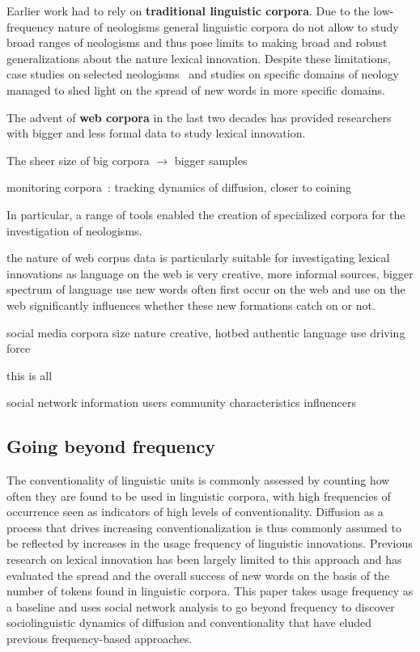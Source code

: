 \documentclass[a4paper]{scrartcl}
\renewcommand{\hw}[1]{\textbf{#1}}
\begin{document}
    Earlier work had to rely on \hw{traditional linguistic corpora}. Due to the low-frequency nature of neologisms general linguistic corpora do not allow to study broad ranges of neologisms and thus pose limits to making broad and robust generalizations about the nature lexical innovation. Despite these limitations, case studies on selected neologisms~\parencite{Hohenhaus2006} and studies on specific domains of neology~\parencite{Elsen2004} managed to shed light on the spread of new words in more specific domains.

    The advent of \hw{web corpora} in the last two decades has provided researchers with bigger and less formal data to study lexical innovation.

      The sheer size of big corpora $\rightarrow$ bigger samples

      monitoring corpora~\parencite{Davies2013}: tracking dynamics of diffusion, closer to coining

      In particular, a range of tools enabled the creation of specialized corpora for the investigation of neologisms.~\parencite{Renouf2006,Kerremans2012,Lemnitzer,Gerard2017,Cartier2017}

      the nature of web corpus data is particularly suitable for investigating lexical innovations as
        language on the web is very creative,
        more informal sources, bigger spectrum of language use
        new words often first occur on the web
        and use on the web significantly influences whether these new formations catch on or not.

    social media corpora \cite{Grieve2016,Eisenstein2014}
      size
      nature
        creative, hotbed
        authentic language use
        driving force

    this is all

      social network information
        users
        community characteristics
        influencers

  \subsection{Going beyond frequency}

    The conventionality of linguistic units is commonly assessed by counting how often they are found to be used in linguistic corpora, with high frequencies of occurrence seen as indicators of high levels of conventionality. Diffusion as a process that drives increasing conventionalization is thus commonly assumed to be reflected by increases in the usage frequency of linguistic innovations. Previous research on lexical innovation has been largely limited to this approach and has evaluated the spread and the overall success of new words on the basis of the number of tokens found in linguistic corpora. This paper takes usage frequency as a baseline and uses social network analysis to go beyond frequency to discover sociolinguistic dynamics of diffusion and conventionality that have eluded previous frequency-based approaches.
\end{document}
